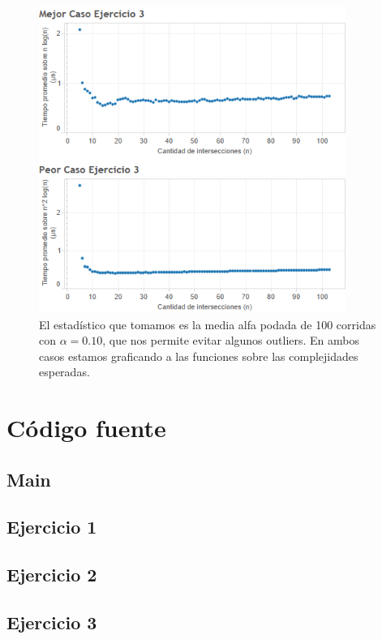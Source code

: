 \documentclass{article}
\theoremstyle{definition}
\theoremstyle{remark}
\begin{document}
\begin{figure}[h!]
\centering
\includegraphics[width=10cm]{ex3}
\caption{El estadístico que tomamos es la media alfa podada de 100 corridas con $\alpha = 0.10$, que nos permite evitar algunos outliers. En ambos casos estamos graficando a las funciones sobre las complejidades esperadas.\label{grf:ex3}}
\end{figure}

\pagebreak

\section{Código fuente}

\subsection{Main}
%

\subsection{Ejercicio 1}
%
%

\subsection{Ejercicio 2}
%
%

\subsection{Ejercicio 3}
%
%
\end{document}
